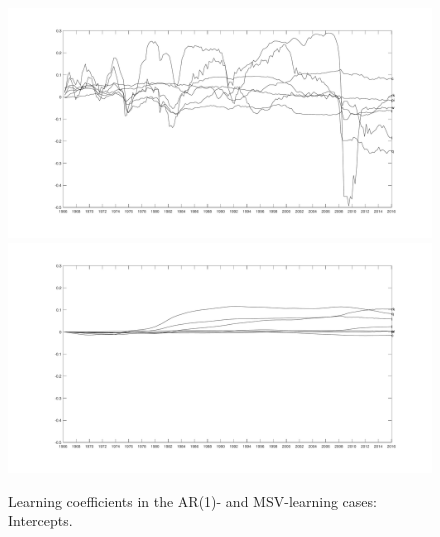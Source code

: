 \documentclass[12pt,reqno]{article}
\numberwithin{equation}{section}
\begin{document}
\begin{figure}[H]

\caption{Learning coefficients in the AR(1)- and MSV-learning cases: Intercepts.} 
\label{sw_learning_1}
\vspace{5 mm}

\includegraphics[scale=0.5]{sw_ar1_learning_alphas.pdf}\\
\includegraphics[scale=0.5]{sw_msv_learning_alphas.pdf}\\


\end{figure}
\end{document}
